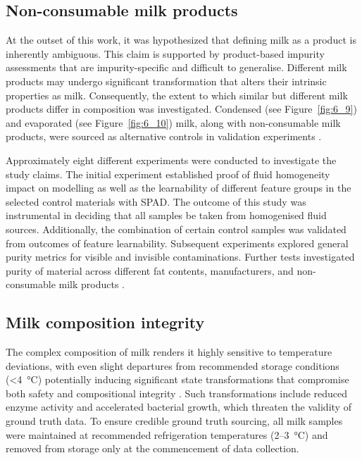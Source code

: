 \documentclass[12pt,a4paper,oneside]{report}
\begin{document}
\subsection{Non-consumable milk products}
\label{subsec:non-consumable_milk_products_chapter6}

At the outset of this work, it was hypothesized that defining milk as a product is inherently ambiguous. This claim is supported by product-based impurity assessments that are impurity-specific and difficult to generalise. Different milk products may undergo significant transformation that alters their intrinsic properties as milk. Consequently, the extent to which similar but different milk products differ in composition was investigated. Condensed (see Figure~\ref{fig:6_9}) and evaporated (see Figure~\ref{fig:6_10}) milk, along with non-consumable milk products, were sourced as alternative controls in validation experiments \cite{walstra1999,nielsen2013}.

Approximately eight different experiments were conducted to investigate the study claims. The initial experiment established proof of fluid homogeneity impact on modelling as well as the learnability of different feature groups in the selected control materials with SPAD. The outcome of this study was instrumental in deciding that all samples be taken from homogenised fluid sources. Additionally, the combination of certain control samples was validated from outcomes of feature learnability. Subsequent experiments explored general purity metrics for visible and invisible contaminations. Further tests investigated purity of material across different fat contents, manufacturers, and non-consumable milk products \cite{aernouts2015,melfsen2012,joolaei2025}.

\subsection{Milk composition integrity}
\label{subsec:milk_composition_integrity_chapter6}

The complex composition of milk renders it highly sensitive to temperature deviations, with even slight departures from recommended storage conditions (<4~°C) potentially inducing significant state transformations that compromise both safety and compositional integrity \cite{walstra1999}. Such transformations include reduced enzyme activity and accelerated bacterial growth, which threaten the validity of ground truth data. To ensure credible ground truth sourcing, all milk samples were maintained at recommended refrigeration temperatures (2--3~°C) and removed from storage only at the commencement of data collection.
\end{document}

